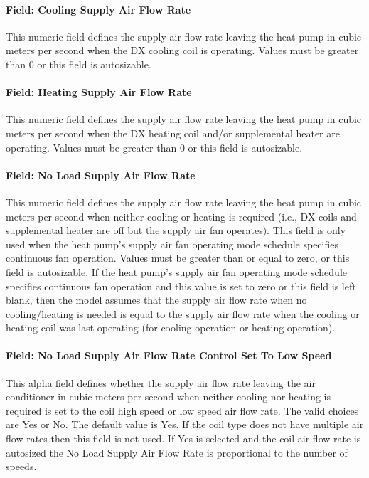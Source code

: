 \paragraph{Field: Cooling Supply Air Flow Rate}\label{field-cooling-supply-air-flow-rate-1-001}

This numeric field defines the supply air flow rate leaving the heat pump in cubic meters per second when the DX cooling coil is operating. Values must be greater than 0 or this field is autosizable.

\paragraph{Field: Heating Supply Air Flow Rate}\label{field-heating-supply-air-flow-rate-1-001}

This numeric field defines the supply air flow rate leaving the heat pump in cubic meters per second when the DX heating coil and/or supplemental heater are operating. Values must be greater than 0 or this field is autosizable.

\paragraph{Field: No Load Supply Air Flow Rate}\label{field-no-load-supply-air-flow-rate-1-001}

This numeric field defines the supply air flow rate leaving the heat pump in cubic meters per second when neither cooling or heating is required (i.e., DX coils and supplemental heater are off but the supply air fan operates). This field is only used when the heat pump's supply air fan operating mode schedule specifies continuous fan operation. Values must be greater than or equal to zero, or this field is autosizable. If the heat pump's supply air fan operating mode schedule specifies continuous fan operation and this value is set to zero or this field is left blank, then the model assumes that the supply air flow rate when no cooling/heating is needed is equal to the supply air flow rate when the cooling or heating coil was last operating (for cooling operation or heating operation).

\paragraph{Field: No Load Supply Air Flow Rate Control Set To Low Speed}\label{field-no-load-supply-air-flow-rate-control-set-to-low-speed-002}

This alpha field defines whether the supply air flow rate leaving the air conditioner in cubic meters per second when neither cooling nor heating is required is set to the coil high speed or low speed air flow rate. The valid choices are Yes or No. The default value is Yes. If the coil type does not have multiple air flow rates then this field is not used. If Yes is selected and the coil air flow rate is autosized the No Load Supply Air Flow Rate is proportional to the number of speeds.

